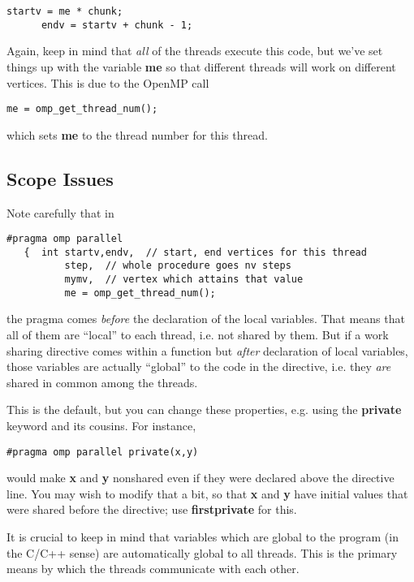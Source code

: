 \begin{Verbatim}[fontsize=\relsize{-2}]
      startv = me * chunk;
      endv = startv + chunk - 1;
\end{Verbatim}

Again, keep in mind that {\it all} of the threads execute this code, but
we've set things up with the variable {\bf me} so that different threads
will work on different vertices.  This is due to the OpenMP call

\begin{Verbatim}[fontsize=\relsize{-2}]
          me = omp_get_thread_num();
\end{Verbatim}

which sets {\bf me} to the thread number for this thread.

\subsection{Scope Issues}

Note carefully that in

\begin{Verbatim}[fontsize=\relsize{-2}]
   #pragma omp parallel
   {  int startv,endv,  // start, end vertices for this thread
          step,  // whole procedure goes nv steps
          mymv,  // vertex which attains that value
          me = omp_get_thread_num();
\end{Verbatim}

the pragma comes {\it before} the declaration of the local variables.
That means that all of them are ``local'' to each thread, i.e. not
shared by them.  But if a work sharing directive comes within a function
but {\it after} declaration of local variables, those variables are
actually ``global'' to the code in the directive, i.e. they {\it are}
shared in common among the threads.

This is the default, but you can change these properties, e.g. using the
{\bf private} keyword and its cousins.  For instance,

\begin{Verbatim}[fontsize=\relsize{-2}]
#pragma omp parallel private(x,y)
\end{Verbatim}

would make {\bf x} and {\bf y} nonshared even if they were declared
above the directive line.  You may wish to modify that a bit, so that
{\bf x} and {\bf y} have initial values that were shared before the
directive; use {\bf firstprivate} for this.

It is crucial to keep in mind that variables which are global to the
program (in the C/C++ sense) are automatically global to all threads.
This is the primary means by which the threads communicate with each
other.

